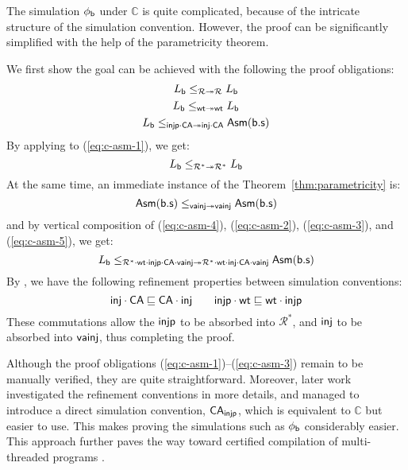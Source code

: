 The simulation $\phi_{ \mathsf{b} }$
under $\mathbb{C}$
is quite complicated,
because of the intricate structure of the simulation convention.
However,
the proof can be significantly simplified
with the help of the parametricity theorem.

We first show
the goal can be achieved
with the following the proof obligations:
\begin{gather}
  L_{ \mathsf{b} } \le_{\mathcal{R} \twoheadrightarrow \mathcal{R}} L_{ \mathsf{b} }
  \label{eq:c-asm-1}\\
  L_{ \mathsf{b} } \le_{ \mathsf{wt}  \twoheadrightarrow  \mathsf{wt} } L_{ \mathsf{b} }
  \label{eq:c-asm-2}\\
  L_{ \mathsf{b} } \le_{ \mathsf{injp}  \cdot  \mathsf{CA}  \twoheadrightarrow  \mathsf{inj}  \cdot  \mathsf{CA} }  \mathsf{Asm(b.s)} 
  \label{eq:c-asm-3}
\end{gather}
By applying {\cite[Theorem~5.6]{compcerto}}
to (\ref{eq:c-asm-1}), we get:
\begin{equation}
  \label{eq:c-asm-4}
  L_{ \mathsf{b} } \le_{\mathcal{R}^* \twoheadrightarrow \mathcal{R}^*} L_{ \mathsf{b} }
\end{equation}
At the same time,
an immediate instance of
the Theorem~\ref{thm:parametricity} is:
\begin{equation}
  \label{eq:c-asm-5}
   \mathsf{Asm} ( \mathsf{b.s} ) \le_{ \mathsf{vainj}  \twoheadrightarrow  \mathsf{vainj} }  \mathsf{Asm} ( \mathsf{b.s} )
\end{equation}
and by vertical composition
of (\ref{eq:c-asm-4}),
(\ref{eq:c-asm-2}), (\ref{eq:c-asm-3}),
and (\ref{eq:c-asm-5}), we get:
\begin{equation}
  L_{ \mathsf{b} }
  \le_{\mathcal{R}^{*} \cdot  \mathsf{wt}  \cdot  \mathsf{injp}  \cdot  \mathsf{CA}  \cdot  \mathsf{vainj} 
    \twoheadrightarrow
  \mathcal{R}^{*} \cdot  \mathsf{wt}  \cdot  \mathsf{inj}  \cdot  \mathsf{CA}  \cdot  \mathsf{vainj} }  \mathsf{Asm(b.s)} 
\end{equation}
By {\cite[Lemma~5.7, Lemma~5.8]{compcerto}},
we have the following refinement properties
between simulation conventions:
\[
   \mathsf{inj}  \cdot  \mathsf{CA} 
  \sqsubseteq
   \mathsf{CA}  \cdot \mathsf{inj} 
  \qquad
   \mathsf{injp}  \cdot  \mathsf{wt} 
  \sqsubseteq
   \mathsf{wt}  \cdot \mathsf{injp} 
\]
These commutations allow
the $ \mathsf{injp} $ to be absorbed into $\mathcal{R}^*$,
and $ \mathsf{inj} $ to be absorbed into $ \mathsf{vainj} $,
thus completing the proof.

Although the proof obligations
(\ref{eq:c-asm-1})--(\ref{eq:c-asm-3})
remain to be manually verified,
they are quite straightforward.
Moreover,
later work \cite{compcerto-dr}
investigated the refinement conventions
in more details,
and managed to introduce
a direct simulation convention, $ \mathsf{CA} _{ \mathsf{injp} }$,
which is equivalent to $\mathbb{C}$
but easier to use.
This makes proving the simulations such as $\phi_{ \mathsf{b} }$
considerably easier.
This approach further
paves the way toward
certified compilation of multi-threaded programs
\cite{compcertoc}.

